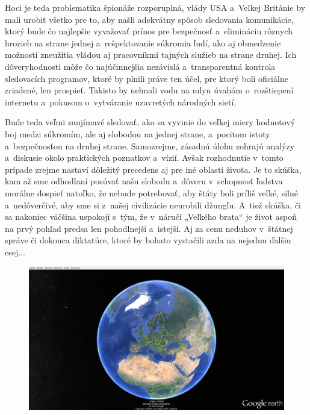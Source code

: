 \documentclass{article}
\begin{document}
Hoci je teda problematika špionáže rozporuplná, vlády USA a~Veľkej Británie by mali urobiť všetko pre to, aby našli adekvátny spôsob sledovania komunikácie, ktorý bude čo najlepšie vyvažovať prínos pre bezpečnosť a~elimináciu rôznych hrozieb na strane jednej a~rešpektovanie súkromia ľudí, ako aj obmedzenie možností zneužitia vládou aj pracovníkmi tajných služieb na strane druhej. Ich dôveryhodnosti môže čo najúčinnejšia nezávislá a~transparentná kontrola sledovacích programov, ktoré by plnili práve ten účel, pre ktorý boli oficiálne zriadené, len prospieť. Takisto by nehnali vodu na mlyn úvahám o~rozštiepení internetu a~pokusom o~vytváranie uzavretých národných sietí.

Bude teda veľmi zaujímavé sledovať, ako sa vyvinie do veľkej miery hodnotový boj medzi súkromím, ale aj slobodou na jednej strane, a~pocitom istoty a~bezpečnosťou na druhej strane. Samozrejme, zásadnú úlohu zohrajú analýzy a~diskusie okolo praktických poznatkov a~vízií. Avšak rozhodnutie v~tomto prípade zrejme nastaví dôležitý precedens aj pre iné oblasti života. Je to skúška, kam až sme odhodlaní posúvať našu slobodu a~dôveru v~schopnosť ľudstva morálne dospieť natoľko, že nebude potrebovať, aby štáty boli príliš veľké, silné a~nedôverčivé, aby sme si z~našej civilizácie neurobili džungľu. A~tiež skúška, či sa nakoniec väčšina uspokojí s~tým, že v~náručí „Veľkého brata“ je život aspoň na prvý pohľad predsa len pohodlnejší a~istejší. Aj za cenu neduhov v~štátnej správe či dokonca diktatúre, ktoré by bohato vystačili azda na nejednu ďalšiu esej...

\begin{figure}[htbp]
\begin{center}
\includegraphics[width=\textwidth]{Zem_2015-9-17}
\end{center}
\end{figure}

\nocite{cnn1}
\nocite{techsme2}
\nocite{techidnes2}
\nocite{sme4}
\nocite{sme8}

\printbibliography

\printindex
\end{document}

